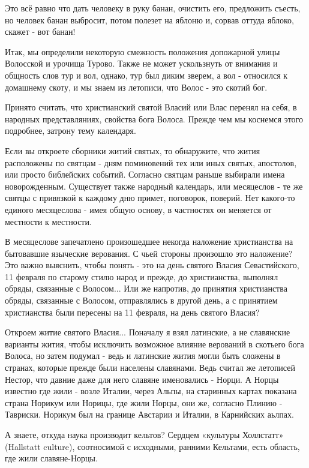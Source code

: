 \documentclass[a5paper,11pt,openany]{article}
\begin{document}
   Это всё равно что дать человеку в руку банан, очистить его, предложить съесть, но человек банан выбросит, потом полезет на яблоню и, сорвав оттуда яблоко, скажет - вот банан!

   Итак, мы определили некоторую смежность положения допожарной улицы Волосской и урочища Турово. Также не может ускользнуть от внимания и общность слов тур и вол, однако, тур был диким зверем, а вол - относился к домашнему скоту, и мы знаем из летописи, что Волос - это скотий бог.

   Принято считать, что христианский святой Власий или Влас перенял на себя, в народных представляниях, свойства бога Волоса. Прежде чем мы коснемся этого подробнее, затрону тему календаря.

   Если вы откроете сборники житий святых, то
 обнаружите, что жития расположены по святцам - дням поминовений тех или иных святых, апостолов, или просто библейских событий. Согласно святцам раньше выбирали имена новорожденным. Существует также народный календарь, или месяцеслов - те же святцы с привязкой к каждому дню примет, поговорок, поверий. Нет какого-то единого месяцеслова - имея общую основу, в частностях он меняется от местности к местности.

   В месяцеслове запечатлено произошедшее некогда наложение христианства на бытовавшие языческие верования. С чьей стороны произошло это наложение? Это важно выяснить, чтобы понять - это на день святого Власия Севастийского, 11 февраля по старому стилю народ и прежде, до христианства, выполнял обряды, связанные с Волосом... Или же напротив, до принятия христианства обряды, связанные с Волосом, отправлялись в другой день, а с принятием христианства были пересены на 11 февраля, на день святого Власия?

    Откроем житие святого Власия... Поначалу я взял латинские, а не славянские варианты жития, чтобы исключить возможное влияние верований в скотьего бога Волоса, но затем подумал - ведь и латинские жития могли быть сложены в странах, которые прежде были населены славянами. Ведь считал же летописей Нестор, что давние даже для него славяне именовались - Норци. А Норцы известно где жили - возле Италии, через Альпы, на старинных картах показана страна Норикум или Норицы, где жили Норцы, они же, согласно Плинию - Тавриски. Норикум был на границе Австарии и Италии, в Карнийских аьлпах. 

   А знаете, откуда наука производит кельтов? Сердцем «культуры Холлстатт» (Hallstatt
culture), соотносимой с исходными, ранними Кельтами, есть область, где жили славяне-Норцы.
\end{document}
